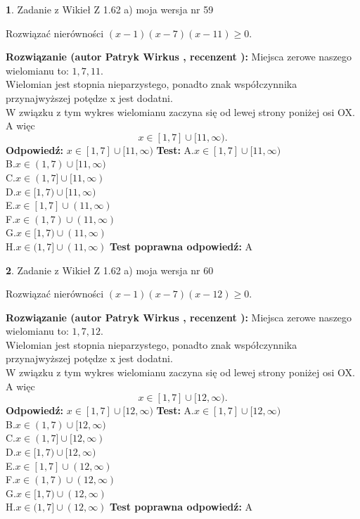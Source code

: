 \documentclass[12pt, a4paper]{article}
\theoremstyle{definition} %
\newtheorem{zad}{}
\newcommand{\zadStart}[1]{\begin{zad}#1\newline}
\newcommand{\zadStop}{\end{zad}}
\newcommand{\rozwStart}[2]{\noindent \textbf{Rozwiązanie (autor #1 , recenzent #2): }\newline}
\newcommand{\rozwStop}{\newline}
\newcommand{\odpStart}{\noindent \textbf{Odpowiedź:}\newline}
\newcommand{\odpStop}{\newline}
\newcommand{\testStart}{\noindent \textbf{Test:}\newline}
\newcommand{\testStop}{\newline}
\newcommand{\kluczStart}{\noindent \textbf{Test poprawna odpowiedź:}\newline}
\newcommand{\kluczStop}{\newline}
\begin{document}
\zadStart{Zadanie z Wikieł Z 1.62 a) moja wersja nr 59}

Rozwiązać nierówności $(x-1)(x-7)(x-11)\ge0$.
\zadStop
\rozwStart{Patryk Wirkus}{}
Miejsca zerowe naszego wielomianu to: $1, 7, 11$.\\
Wielomian jest stopnia nieparzystego, ponadto znak współczynnika przy\linebreak najwyższej potędze x jest dodatni.\\ W związku z tym wykres wielomianu zaczyna się od lewej strony poniżej osi OX. A więc $$x \in [1,7] \cup [11,\infty).$$
\rozwStop
\odpStart
$x \in [1,7] \cup [11,\infty)$
\odpStop
\testStart
A.$x \in [1,7] \cup [11,\infty)$\\
B.$x \in (1,7) \cup [11,\infty)$\\
C.$x \in (1,7] \cup [11,\infty)$\\
D.$x \in [1,7) \cup [11,\infty)$\\
E.$x \in [1,7] \cup (11,\infty)$\\
F.$x \in (1,7) \cup (11,\infty)$\\
G.$x \in [1,7) \cup (11,\infty)$\\
H.$x \in (1,7] \cup (11,\infty)$
\testStop
\kluczStart
A
\kluczStop



\zadStart{Zadanie z Wikieł Z 1.62 a) moja wersja nr 60}

Rozwiązać nierówności $(x-1)(x-7)(x-12)\ge0$.
\zadStop
\rozwStart{Patryk Wirkus}{}
Miejsca zerowe naszego wielomianu to: $1, 7, 12$.\\
Wielomian jest stopnia nieparzystego, ponadto znak współczynnika przy\linebreak najwyższej potędze x jest dodatni.\\ W związku z tym wykres wielomianu zaczyna się od lewej strony poniżej osi OX. A więc $$x \in [1,7] \cup [12,\infty).$$
\rozwStop
\odpStart
$x \in [1,7] \cup [12,\infty)$
\odpStop
\testStart
A.$x \in [1,7] \cup [12,\infty)$\\
B.$x \in (1,7) \cup [12,\infty)$\\
C.$x \in (1,7] \cup [12,\infty)$\\
D.$x \in [1,7) \cup [12,\infty)$\\
E.$x \in [1,7] \cup (12,\infty)$\\
F.$x \in (1,7) \cup (12,\infty)$\\
G.$x \in [1,7) \cup (12,\infty)$\\
H.$x \in (1,7] \cup (12,\infty)$
\testStop
\kluczStart
A
\kluczStop
\end{document}

